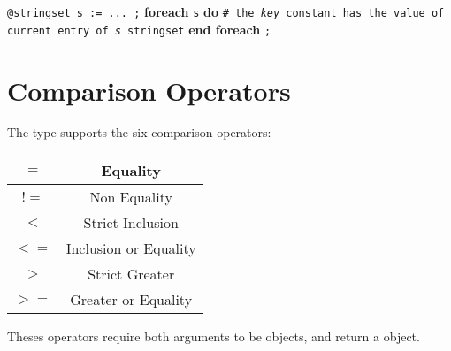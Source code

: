 \texttt{@stringset s := ... ;}\newline
\textbf{foreach} \texttt {s} \textbf {do}\newline
\texttt{\# the \emph{key} constant has the value of current entry of \emph{s} stringset}\newline
\textbf{end foreach} \texttt{;}







\section{Comparison Operators}

The  type supports the six comparison operators:\newline

\begin{tabular}{|c|c|}
\hline
$=$ & Equality \\
\hline
$!=$ & Non Equality \\
\hline
$<$  & Strict Inclusion \\
\hline
$<=$  & Inclusion or Equality \\
\hline
$>$  & Strict Greater \\
\hline
$>=$  & Greater or Equality \\
\hline
\end{tabular}

Theses operators require both arguments to be  objects, and return a  object.


